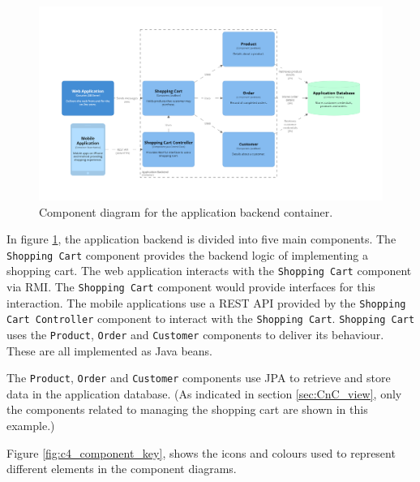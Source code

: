 \begin{figure}[h!]
    \centering
    \begin{adjustwidth}{-8.5mm}{-8.5mm}
        \includegraphics[trim=190 185 197 198,clip,width=0.96\paperwidth]{images/c4/appbackend_component_diagram.png}
    \end{adjustwidth}
    \caption{Component diagram for the application backend container.}
    \label{fig:c4_component_appbackend}
\end{figure}

\noindent
In figure \ref{fig:c4_component_appbackend}, the application backend is divided into five main components.
The \texttt{Shopping Cart} component provides the backend logic of implementing a shopping cart.
The web application interacts with the \texttt{Shopping Cart} component via RMI.
The \texttt{Shopping Cart} component would provide interfaces for this interaction.
The mobile applications use a REST API provided by the \texttt{Shopping Cart Controller} component to interact with the \texttt{Shopping Cart}.
\texttt{Shopping Cart} uses the \texttt{Product}, \texttt{Order} and \texttt{Customer} components to deliver its behaviour.
These are all implemented as Java beans.

The \texttt{Product}, \texttt{Order} and \texttt{Customer} components use JPA to retrieve and store data in the application database.
(As indicated in section \ref{sec:CnC_view}, only the components related to managing the shopping cart are shown in this example.)

Figure \ref{fig:c4_component_key}, shows the icons and colours used to represent different elements in the component diagrams.

